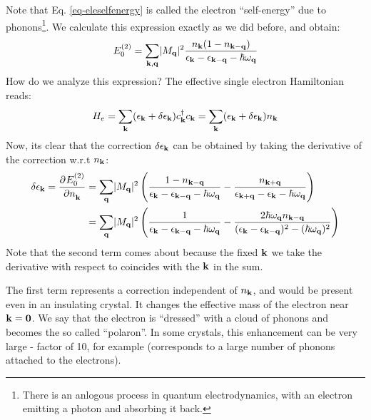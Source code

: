 Note that Eq. \eqref{eq-eleselfenergy} is called the electron ``self-energy'' due to phonons\footnote{There is an anlogous process in quantum electrodynamics, with an electron emitting a photon and absorbing it back.}. We calculate this expression exactly as we did before, and obtain:
\begin{equation}
    E_0^{(2)} = \sum_{\mathbf{k}, \mathbf{q}}\lvert M_{\mathbf{q}} \rvert^2 \frac{n_{\mathbf{k}}(1 - n_{\mathbf{k} - \mathbf{q}})}{\epsilon_{\mathbf{k}} - \epsilon_{\mathbf{k} - \mathbf{q}} - \hbar \omega_{\mathbf{q}}}
\end{equation}
How do we analyze this expression? The effective single electron Hamiltonian reads:
\begin{equation}
    H_e = \sum_{\mathbf{k}}(\epsilon_{\mathbf{k}} + \delta \epsilon_{\mathbf{k}})c^\dagger_{\mathbf{k}}c_{\mathbf{k}} = \sum_{\mathbf{k}}(\epsilon_{\mathbf{k}} + \delta \epsilon_{\mathbf{k}})n_{\mathbf{k}}
\end{equation}
Now, its clear that the correction $\delta \epsilon_{\mathbf{k}}$ can be obtained by taking the derivative of the correction w.r.t $n_{\mathbf{k}}$:
\begin{equation}
    \begin{split}
        \delta \e_{\v{k}} = \dpd{E_{0}^{(2)}}{n_{\v{k}}} &= \sum_{\v{q}}\abs{M_{\v{q}}}^2 \left(\frac{1 - n_{\v{k} - \v{q}}}{\e_{\v{k}} - \e_{\v{k} - \v{q}} - \hbar \omega_{\v{q}}} - \frac{n_{\v{k} + \v{q}}}{\e_{\v{k} + \v{q}} - \e_{\v{k}} - \hbar \omega_{\v{q}}}\right)
        \\ &= \sum_{\v{q}}\abs{M_{\v{q}}}^2 \left(\frac{1}{\e_{\v{k}} - \e_{\v{k} - \v{q}} - \hbar \omega_{\v{q}}} - \frac{2\hbar \omega_{\v{q}}n_{\v{k} - \v{q}}}{(\e_{\v{k}} - \e_{\v{k} - \v{q}})^2 - (\hbar \omega_{\v{q}})^2}\right)
    \end{split}
\end{equation}
Note that the second term comes about because the fixed $\mathbf{k}$ we take the derivative with respect to coincides with the $\mathbf{k}$ in the sum. 

The first term represents a correction independent of $n_{\mathbf{k}}$, and would be present even in an insulating crystal. It changes the effective mass of the electron near $\mathbf{k} = \mathbf{0}$. We say that the electron is ``dressed'' with a cloud of phonons and becomes the so called ``polaron''. In some crystals, this enhancement can be very large - factor of 10, for example (corresponds to a large number of phonons attached to the electrons).

